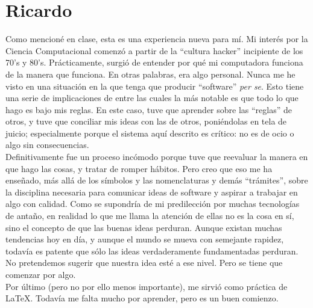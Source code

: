\documentclass{scrreprt}
\begin{document}
\section{Ricardo}
Como mencion\'{e} en clase, esta es una experiencia nueva para mí. Mi inter\'{e}s por la Ciencia Computacional comenzó a partir de la “cultura hacker” incipiente de los 70's y 80's. Prácticamente, surgió de entender por
qu\'{e} mi computadora funciona de la manera que funciona. En otras palabras, era algo personal. Nunca me he visto en una situación en la que tenga que producir “software” \textsl{per se}. Esto tiene una serie de 
implicaciones de entre las cuales la más notable es que todo lo que hago es bajo mis reglas. En este caso, tuve que aprender sobre las “reglas” de otros, y tuve que conciliar mis ideas con las de otros, poni\'{e}ndolas
en tela de juicio; especialmente porque el sistema aquí descrito es crítico: no es de ocio o algo sin consecuencias.\\

Definitivamente fue un proceso incómodo porque tuve que reevaluar la manera en que hago las cosas, y tratar de romper hábitos. Pero creo que eso me ha enseñado, más allá de los símbolos y las nomenclaturas y demás 
“trámites”, sobre la disciplina necesaria para comunicar ideas de software y aspirar a trabajar en algo con calidad. Como se supondría de mi predilección por muchas tecnologías de antaño, en realidad lo que me llama la
atención de ellas no es la cosa en sí, sino el concepto de que las buenas ideas perduran. Aunque existan muchas tendencias hoy en día, y aunque el mundo se mueva con semejante rapidez, todavía es patente que sólo las
ideas verdaderamente fundamentadas perduran. No pretendemos sugerir que nuestra idea est\'{e} a ese nivel. Pero se tiene que comenzar por algo.\\

Por último (pero no por ello menos importante), me sirvió como práctica de \LaTeX. Todavía me falta mucho por aprender, pero es un buen
comienzo.
\end{document}
